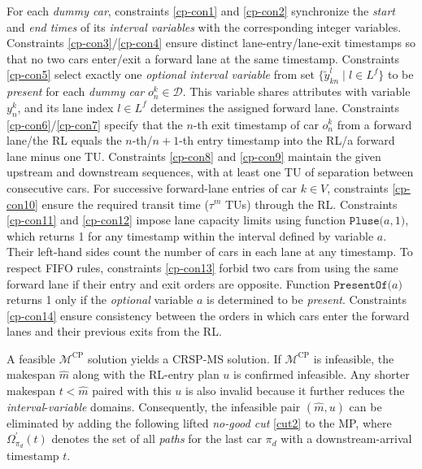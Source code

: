 \documentclass[12pt]{article}
\begin{document}
For each \textit{dummy car}, constraints \eqref{cp-con1} and \eqref{cp-con2} synchronize the \textit{start} and \textit{end times} of its \textit{interval variables} with the corresponding integer variables. %
Constraints \eqref{cp-con3}/\eqref{cp-con4} ensure distinct lane-entry/lane-exit timestamps so that no two cars enter/exit a forward lane at the same timestamp. Constraints \eqref{cp-con5} select exactly one \textit{optional interval variable} from set $\{\widetilde{y}^l_{kn}\mid l\in L^f\}$ to be \textit{present} for each \textit{dummy car} $o^k_n\in \mathcal{D}$. This variable shares attributes with variable $y^k_n$, and its lane index $l\in L^f$ determines the assigned forward lane. Constraints \eqref{cp-con6}/\eqref{cp-con7} specify that the $n$-th exit timestamp of car $o^k_n$ from a forward lane/the RL equals the $n$-th/$n+1$-th entry timestamp into the RL/a forward lane minus one TU. Constraints \eqref{cp-con8} and \eqref{cp-con9} maintain the given upstream and downstream sequences, with at least one TU of separation between consecutive cars. For successive forward-lane entries of car $k\in V$, constraints \eqref{cp-con10} ensure the required transit time ($\tau^m$ TUs) through the RL. Constraints \eqref{cp-con11} and \eqref{cp-con12} impose lane capacity limits using function $\texttt{Pluse($a,1$)}$, which returns 1 for any timestamp within the interval defined by variable $a$. Their left-hand sides count the number of cars in each lane at any timestamp. To respect FIFO rules, constraints \eqref{cp-con13} forbid two cars from using the same forward lane if their entry and exit orders are opposite. Function $\texttt{PresentOf($a$)}$ returns 1 only if the \textit{optional} variable $a$ is determined to be \textit{present}. Constraints \eqref{cp-con14} ensure consistency between the orders in which cars enter the forward lanes and their previous exits from the RL.


A feasible $\mathcal{M}^{\text{CP}}$ solution yields a CRSP-MS solution. If $\mathcal{M}^{\text{CP}}$ is infeasible, the makespan $\widehat{m}$ along with the RL-entry plan $u$ is confirmed infeasible. Any shorter makespan $t<\widehat{m}$ paired with this $u$ is also invalid because it further reduces the \textit{interval}-\textit{variable} domains. Consequently, the infeasible pair $(\widehat{m},u)$ can be eliminated by adding the following lifted \textit{no-good cut} \eqref{cut2} to the MP, where $\Omega_{\pi_d}^{\prime}(t)$ denotes the set of all \textit{paths} for the last car $\pi_d$ with a downstream-arrival timestamp $t$.
\end{document}
